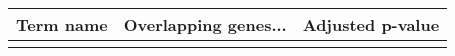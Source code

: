 \begin{tabular}{lll}
\toprule
Term name & Overlapping genes... & Adjusted p-value \\
\midrule
          &                      &                  \\
\bottomrule
\end{tabular}
